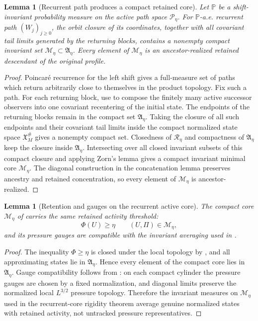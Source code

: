 \documentclass[11pt]{amsart}
\numberwithin{equation}{section}
\theoremstyle{plain}
\newtheorem{lemma}[theorem]{Lemma}
\theoremstyle{definition}
\theoremstyle{remark}
\newcommand{\calM}{\mathcal M}
\begin{document}
\begin{lemma}[Recurrent path produces a compact retained core]
\label{lem:recurrent-path-compact-core}
Let \(\mathbb P\) be a shift-invariant probability measure on the active path
space \(\mathscr P_\eta\).  For \(\mathbb P\)-a.e. recurrent path
\((W_j)_{j\ge0}\), the orbit closure of its coordinates, together with all
covariant tail limits generated by the returning blocks, contains a nonempty
compact invariant set \(\calM_\eta\subset\mathfrak A_\eta\).  Every element of
\(\calM_\eta\) is an ancestor-realized retained descendant of the original
profile.
\end{lemma}

\begin{proof}
Poincar\'e recurrence for the left shift gives a full-measure set of paths which
return arbitrarily close to themselves in the product topology.  Fix such a
path.  For each returning block, use
 to compose the finitely many active
successor observers into one covariant recentering of the initial state.  The
endpoints of the returning blocks remain in the compact set
\(\mathfrak A_\eta\).  Taking the closure of all such endpoints and their
covariant tail limits inside the compact normalized state space
\(\mathfrak X_M^\#\) gives a nonempty compact set.  Closedness of
\(\mathcal R_\eta\) and compactness of \(\mathfrak A_\eta\) keep the closure
inside \(\mathfrak A_\eta\).  Intersecting over all closed invariant subsets of
this compact closure and applying Zorn's lemma gives a compact invariant
minimal core \(\calM_\eta\).  The diagonal construction in the concatenation
lemma preserves ancestry and retained concentration, so every element of
\(\calM_\eta\) is ancestor-realized.
\end{proof}

\begin{lemma}[Retention and gauges on the recurrent active core]
\label{lem:active-core-retention-gauges}
The compact core \(\calM_\eta\) of
 carries the same retained activity
threshold:
\[
   \Phi(U)\ge\eta\qquad (U,\Pi)\in\calM_\eta,
\]
and its pressure gauges are compatible with the invariant averaging used in
.
\end{lemma}

\begin{proof}
The inequality \(\Phi\ge\eta\) is closed under the local topology by
, and all approximating states lie in
\(\mathfrak A_\eta\).  Hence every element of the compact core lies in
\(\mathfrak A_\eta\).  Gauge compatibility follows from
: on each compact cylinder the pressure gauges are
chosen by a fixed normalization, and diagonal limits preserve the normalized
local \(L^{3/2}\) pressure topology.  Therefore the invariant measures on
\(\calM_\eta\) used in the recurrent-core rigidity theorem average genuine
normalized states with retained activity, not untracked pressure representatives.
\end{proof}
\end{document}
